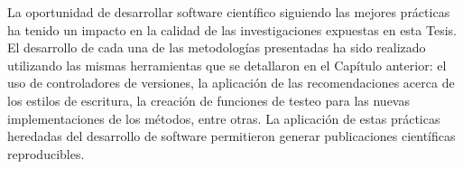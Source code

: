 La oportunidad de desarrollar software científico siguiendo las mejores
prácticas ha tenido un impacto en la calidad de las investigaciones
expuestas en esta Tesis.
El desarrollo de cada una de las metodologías presentadas ha sido realizado
utilizando las mismas herramientas que se detallaron en el Capítulo anterior:
el uso de controladores de versiones, la aplicación de las recomendaciones
acerca de los estilos de escritura, la creación de funciones de testeo para las
nuevas implementaciones de los métodos, entre otras.
La aplicación de estas prácticas heredadas del desarrollo de software
permitieron generar publicaciones científicas reproducibles.






